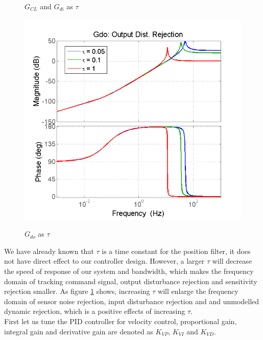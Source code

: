 \documentclass[letterpaper]{article}
\begin{document}
\begin{figure}[H]
\begin{center}
\caption{$G_{CL}$ and $G_{di}$ as $\tau$}
\label{q3_9}
\includegraphics[scale=0.4]{q3_10}
\caption{$G_{do}$ as $\tau$}
\label{q3_10}
\end{center}
\end{figure}
We have already known that $\tau$ is a time constant for the position filter, it does not have direct effect to our controller design. However, a larger $\tau$ will decrease the speed of response of our system and bandwidth, which makes the frequency domain of tracking command signal, output disturbance rejection and sensitivity rejection smaller. As figure \ref{q3_10} shows, increasing $\tau$ will enlarge the frequency domain of sensor noise rejection, input disturbance rejection and and unmodelled dynamic rejection, which is a positive effects of increasing $\tau$.\\

First let us tune the PID controller for velocity control, proportional gain, integral gain and derivative gain are denoted as $K_{VP}$, $K_{VI}$ and $K_{VD}$.
\end{document}
